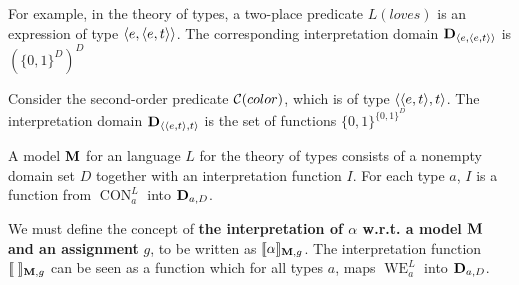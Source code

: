\documentclass[11pt]{article}
\DeclareMathOperator{\CON}{CON}
\DeclareMathOperator{\WE}{WE}
\begin{document}
For example, in the theory of types, a two-place predicate \(L(loves)\) is
an expression of type \(\langle e,\langle e,t\rangle\rangle\). The corresponding
interpretation domain \(\operatorname{\textbf{D}}_{\langle e,\langle e,t\rangle\rangle}\) is \((\{0,1\}^D)^D\)

Consider the second-order predicate \(\mathcal{C}(color)\), which is of type
\(\langle\langle e,t\rangle,t\rangle\). The interpretation domain \(\operatorname{\textbf{D}}_{\langle\langle
    e,t\rangle,t\rangle}\) is the set of functions \(\{0,1\}^{\{0,1\}^D}\)

A model \(\operatorname{\textbf{M}}\) for an language \(L\) for the theory of types consists of a
nonempty domain set \(D\) together with an interpretation function \(I\).
For each type \(a\), \(I\) is a function from \(\CON_a^L\) into \(\operatorname{\textbf{D}}_{a,D}\).

We must define the concept of \textbf{the interpretation of \(\alpha\) w.r.t. a model \(\operatorname{\textbf{M}}\)}
\textbf{and an assignment} \(g\), to be written as
\(\llbracket\alpha\rrbracket_{\operatorname{\textbf{M}},g}\). The interpretation
function\(\llbracket\;\rrbracket_{\operatorname{\textbf{M}},g}\) can be seen as a function which
for all types \(a\), maps \(\WE^L_a\) into \(\operatorname{\textbf{D}}_{a,D}\).
\end{document}
